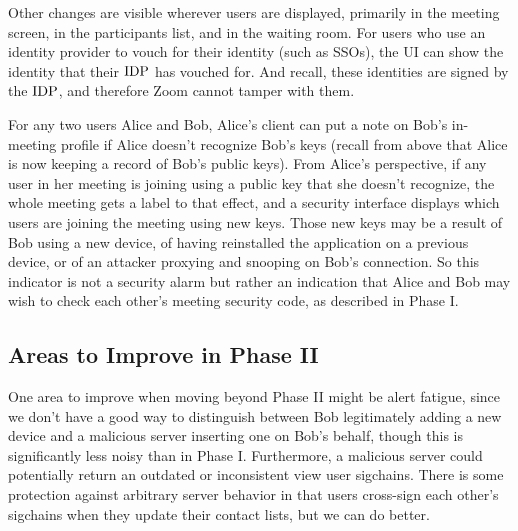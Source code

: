 Other changes are visible wherever users are displayed, primarily in the meeting screen, in the participants list, and in the waiting room. For users who use an identity provider to vouch for their identity (such as SSOs), the UI can show the identity that their $\mathrm{IDP}$ has vouched for. And recall, these identities are signed by the $\mathrm{IDP}$, and therefore Zoom cannot tamper with them.

For any two users Alice and Bob, Alice's client can put a note on Bob's in-meeting profile if Alice doesn't recognize Bob's keys (recall from above that Alice is now keeping a record of Bob's public keys). From Alice's perspective, if any user in her meeting is joining using a public key that she doesn't recognize, the whole meeting gets a label to that effect, and a security interface displays which users are joining the meeting using new keys. Those new keys may be a result of Bob using a new device, of having reinstalled the application on a previous device, or of an attacker proxying and snooping on Bob's connection. So this indicator is not a security alarm but rather an indication that Alice and Bob may wish to check each other's meeting security code, as described in Phase I.

\subsection{Areas to Improve in Phase II}

One area to improve when moving beyond Phase II might be alert fatigue, since we don't have a good way to distinguish between Bob legitimately adding a new device and a malicious server inserting one on Bob's behalf, though this is significantly less noisy than in Phase I. Furthermore, a malicious server could potentially return an outdated or inconsistent view user sigchains. There is some protection against arbitrary server behavior in that users cross-sign each other's sigchains when they update their contact lists, but we can do better.
